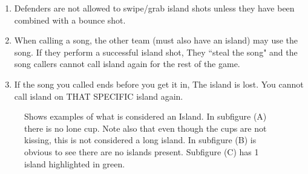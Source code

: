 \begin{enumerate}[label=(\roman*), ref=\roman*]
            \item \label{itm:IslandShots,swiping} Defenders are not allowed to swipe/grab island shots unless they have been combined with a bounce shot.
            \item \label{itm:IslandShots,stelaing} When calling a  song, the other team (must also have an island) may use the song.
                If they perform a successful island shot, They ``steal the song" and the song callers cannot call island again for the rest of the game.
            \item \label{itm:IslandShots,endsong} If the song you called ends before you get it in, The island is lost.
                You cannot call island on THAT SPECIFIC island again.
        \end{enumerate}
        \begin{figure}[H]
            \centering
            \def\svgwidth{\columnwidth}
            
            \caption{Shows examples of what is considered an Island. In subfigure (A) there is no lone cup. Note also that even though the cups are not kissing, this is not considered a long island. In subfigure (B) is obvious to see there are no islands present. Subfigure (C) has 1 island highlighted in green.}
            \label{fig:islandExamples}
        \end{figure}
